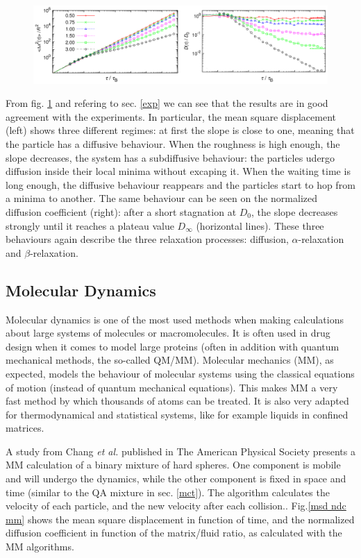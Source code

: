 \documentclass[a4paper,12pt]{article}
\newcommand{\jline}{\vspace{10pt}}
\newcommand{\etal}{\textit{et al.}}
\begin{document}
\begin{figure}[htbp]
\centering
\subfigure
{\includegraphics[width=14cm]{pics/msd_ndc_mc.png}}
\caption{}
\label{msd ndc mc}
\end{figure}

From fig. \ref{msd ndc mc} and refering to sec. \ref{exp} we can see that the results are in good agreement with the experiments. In particular,
the mean square displacement (left) shows three different regimes: at first the slope is close to one, meaning that the particle has a diffusive
behaviour. When the roughness is high enough, the slope decreases, the system has a subdiffusive behaviour: the particles udergo diffusion 
inside their local minima without excaping it. When the waiting time is long enough, the diffusive behaviour reappears and the particles start
to hop from a minima to another. The same behaviour can be seen on the normalized diffusion coefficient (right): after a short stagnation at 
$D_0$, the slope decreases strongly until it reaches a plateau value $D_{\infty}$ (horizontal lines). These three behaviours again describe 
the three relaxation processes: diffusion, $\alpha$-relaxation and $\beta$-relaxation.

\subsection{Molecular Dynamics}

Molecular dynamics is one of the most used methods when making calculations about large systems of molecules or macromolecules. It is often 
used in drug design when it comes to model large proteins (often in addition with quantum mechanical methods, the so-called QM/MM). Molecular
mechanics (MM), as expected, models the behaviour of molecular systems using the classical equations of motion (instead of quantum mechanical
equations). This makes MM a very fast method by which thousands of atoms can be treated. It is also very adapted for thermodynamical and 
statistical systems, like for example liquids in confined matrices.\jline

A study from Chang \etal \cite{Chang2004} published in The American Physical Society presents a MM calculation of a binary mixture of hard
spheres. One component is mobile and will undergo the dynamics, while the other component is fixed in space and time (similar to the QA mixture
in sec. \ref{mct}). The algorithm calculates the velocity of each particle, and the new velocity after each collision.. Fig.\ref{msd ndc mm} 
shows the mean square displacement in function of time, and the normalized diffusion coefficient in function of the matrix/fluid ratio, as 
calculated with the MM algorithms.\jline
\end{document}
